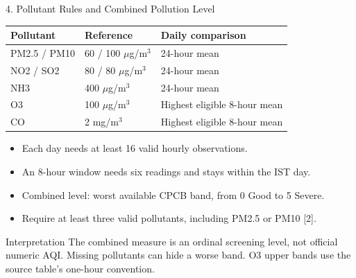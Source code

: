 \documentclass[aspectratio=169,10pt]{beamer}
\begin{document}
\begin{frame}{4. Pollutant Rules and Combined Pollution Level}
\begin{center}\begin{tabular}{lll}\toprule
Pollutant & Reference & Daily comparison\\\midrule
PM2.5 / PM10 & 60 / 100 $\mu$g/m$^3$ & 24-hour mean\\
NO2 / SO2 & 80 / 80 $\mu$g/m$^3$ & 24-hour mean\\
NH3 & 400 $\mu$g/m$^3$ & 24-hour mean\\
O3 & 100 $\mu$g/m$^3$ & Highest eligible 8-hour mean\\
CO & 2 mg/m$^3$ & Highest eligible 8-hour mean\\\bottomrule
\end{tabular}\end{center}
\begin{itemize}
\item Each day needs at least 16 valid hourly observations.
\item An 8-hour window needs six readings and stays within the IST day.
\item Combined level: worst available CPCB band, from 0 Good to 5 Severe.
\item Require at least three valid pollutants, including PM2.5 or PM10 [2].
\end{itemize}
\begin{block}{Interpretation}
The combined measure is an ordinal screening level, not official numeric AQI. Missing pollutants can hide a worse band. O3 upper bands use the source table's one-hour convention.
\end{block}
\end{frame}
\end{document}
